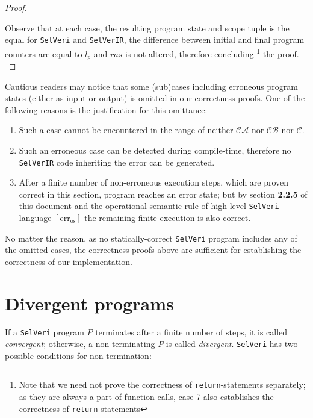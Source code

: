 \documentclass{article}
\begin{document}
\begin{proof}
\begin{itemize}
  
    

\end{itemize}

Observe that at each case, the resulting program state and scope tuple is the equal for \texttt{SelVeri} and \texttt{SelVerIR}, the difference between initial and final program counters are equal to $l_p$ and $ras$ is not altered, therefore concluding \footnote{Note that we need not prove the correctness of \texttt{return}-statements separately; as they are always a part of function calls, case 7 also establishes the correctness of \texttt{return}-statements} the proof.
\\
\end{proof}

\newpage
Cautious readers may notice that some (sub)cases including erroneous program states (either as input or output) is omitted in our correctness proofs. One of the following reasons is the justification for this omittance:

\begin{enumerate}
    \item Such a case cannot be encountered in the range of neither $\mathcal{CA}$ nor $\mathcal{CB}$ nor $\mathcal{C}$.

    \item Such an erroneous case can be detected during compile-time, therefore no \texttt{SelVerIR} code inheriting the error can be generated.

    \item After a finite number of non-erroneous execution steps, which are proven correct in this section, program reaches an error state; but by section \textbf{2.2.5} of this document and the operational semantic rule of high-level \texttt{SelVeri} language $[ \text{err}_{\text{os}} ]$ the remaining finite execution is also correct.
\end{enumerate}

No matter the reason, as no statically-correct \texttt{SelVeri} program includes any of the omitted cases, the correctness proofs above are sufficient for establishing the correctness of our implementation. \\

\vspace{1em}
\section{Divergent programs}

If a \texttt{SelVeri} program $P$ terminates after a finite number of steps, it is called \textit{convergent}; otherwise, a non-terminating $P$ is called \textit{divergent}. \texttt{SelVeri} has two possible conditions for non-termination:
\end{document}
